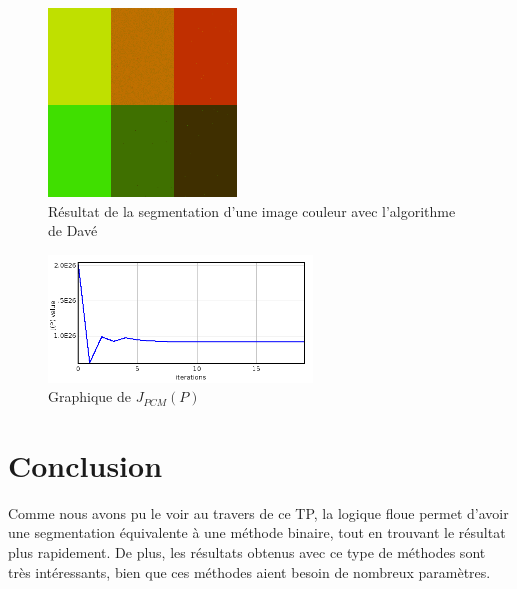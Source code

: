 \documentclass[a4paper,11pt]{article}
\begin{document}
\begin{figure}[!h]
  \begin{center}
    \includegraphics[width=5cm]{resultat/DAV.png}
    \caption{Résultat de la segmentation d'une image couleur avec l'algorithme de Davé}
    \label{fig:dave}
  \end{center}
\end{figure}

\begin{figure}[!h]
  \begin{center}
    \includegraphics[width=7cm]{resultat/DAV_graph.png}
    \caption{Graphique de $J_{PCM}(P)$}
    \label{fig:graphDAVE}
  \end{center}
\end{figure}

\newpage
\section{Conclusion}
Comme nous avons pu le voir au travers de ce TP, la logique floue permet d'avoir 
une segmentation équivalente à une méthode binaire, tout en trouvant le résultat 
plus rapidement. De plus, les résultats obtenus avec ce type de méthodes sont très 
intéressants, bien que ces méthodes aient besoin de nombreux paramètres. 
  
\end{document}
